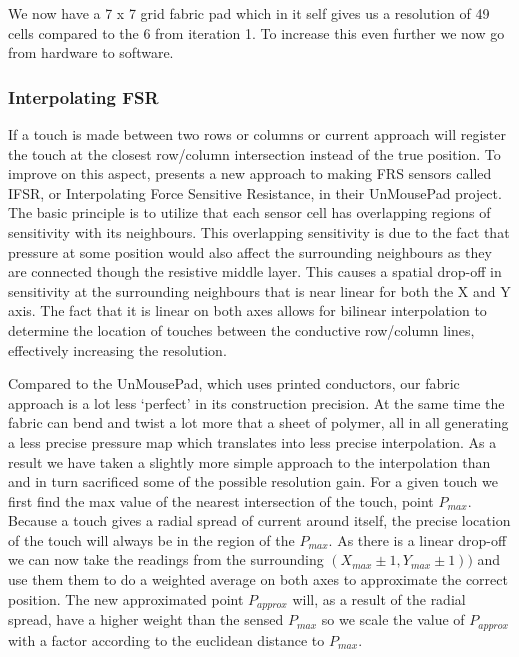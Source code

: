 We now have a 7 x 7 grid fabric pad which in it self gives us a resolution of 49 cells compared to the 6 from iteration 1.
To increase this even further we now go from hardware to software.

\subsubsection{Interpolating FSR}
If a touch is made between two rows or columns or current approach will register the touch at the closest row/column intersection instead of the true position.
To improve on this aspect, \citet{rosenberg2009unmousepad} presents a new approach to making FRS sensors called IFSR, or Interpolating Force Sensitive Resistance, in their UnMousePad project. The basic principle is to utilize that each sensor cell has overlapping regions of sensitivity with its neighbours.
This overlapping sensitivity is due to the fact that pressure at some position would also affect the surrounding neighbours as they are connected though the resistive middle layer.
This causes a spatial drop-off in sensitivity at the surrounding neighbours that is near linear for both the X and Y axis.
The fact that it is linear on both axes allows for bilinear interpolation to determine the location of touches between the conductive row/column lines, effectively increasing the resolution. 

Compared to the UnMousePad, which uses printed conductors, our fabric approach is a lot less `perfect' in its construction precision.
At the same time the fabric can bend and twist a lot more that a sheet of polymer, all in all generating a less precise pressure map which translates into less precise interpolation.
As a result we have taken a slightly more simple approach to the interpolation than \citep{rosenberg2009unmousepad} and in turn sacrificed some of the possible resolution gain.
\blank
For a given touch we first find the max value of the nearest intersection of the touch, point \(P_{max}\).
Because a touch gives a radial spread of current around itself, the precise location of the touch will always be in the region of the \(P_{max}\).
As there is a linear drop-off we can now take the readings from the surrounding \((X_{max}\pm1,Y_{max}\pm1))\) and use them them to do a weighted average on both axes to approximate the correct position.
The new approximated point \(P_{approx}\) will, as a result of the radial spread, have a higher weight than the sensed \(P_{max}\) so we scale the value of \(P_{approx}\) with a factor according to the euclidean distance to \(P_{max}\). 

